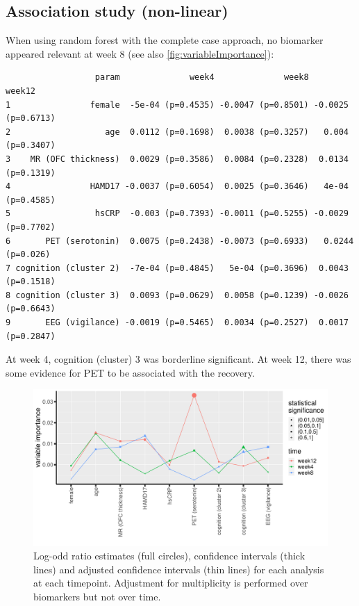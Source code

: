 \documentclass[12pt]{article}
\begin{document}
\subsection{Association study (non-linear)}
\label{sec:org87f0daf}

When using random forest with the complete case approach, no biomarker
appeared relevant at week 8 (see also \autoref{fig:variableImportance}):
\begin{verbatim}
                  param              week4              week8             week12
1                female  -5e-04 (p=0.4535) -0.0047 (p=0.8501) -0.0025 (p=0.6713)
2                   age  0.0112 (p=0.1698)  0.0038 (p=0.3257)   0.004 (p=0.3407)
3    MR (OFC thickness)  0.0029 (p=0.3586)  0.0084 (p=0.2328)  0.0134 (p=0.1319)
4                HAMD17 -0.0037 (p=0.6054)  0.0025 (p=0.3646)   4e-04 (p=0.4585)
5                 hsCRP  -0.003 (p=0.7393) -0.0011 (p=0.5255) -0.0029 (p=0.7702)
6       PET (serotonin)  0.0075 (p=0.2438) -0.0073 (p=0.6933)   0.0244 (p=0.026)
7 cognition (cluster 2)  -7e-04 (p=0.4845)   5e-04 (p=0.3696)  0.0043 (p=0.1518)
8 cognition (cluster 3)  0.0093 (p=0.0629)  0.0058 (p=0.1239) -0.0026 (p=0.6643)
9       EEG (vigilance) -0.0019 (p=0.5465)  0.0034 (p=0.2527)  0.0017 (p=0.2847)
\end{verbatim}

At week 4, cognition (cluster) 3 was borderline significant. At week
12, there was some evidence for PET to be associated with the
recovery.

\begin{figure}[!h]
\centering
\includegraphics[trim={0 0 0 0},width=\textwidth]{./figures/variableImportance.pdf}
\caption{\label{fig:variableImportance}Log-odd ratio estimates (full circles), confidence intervals (thick lines) and adjusted confidence intervals (thin lines) for each analysis at each timepoint. Adjustment for multiplicity is performed over biomarkers but not over time.}
\end{figure}
\end{document}
